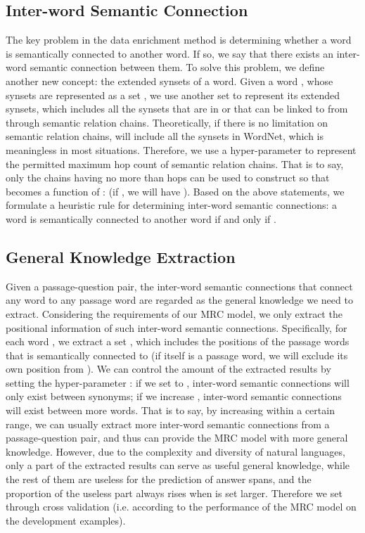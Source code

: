 \documentclass[11pt,a4paper]{article}
\begin{document}
\subsection{Inter-word Semantic Connection}
The key problem in the data enrichment method is determining whether a word is semantically connected to another word. If so, we say that there exists an inter-word semantic connection between them. To solve this problem, we define another new concept: the extended synsets of a word. Given a word , whose synsets are represented as a set , we use another set  to represent its extended synsets, which includes all the synsets that are in  or that can be linked to from  through semantic relation chains. Theoretically, if there is no limitation on semantic relation chains,  will include all the synsets in WordNet, which is meaningless in most situations. Therefore, we use a hyper-parameter  to represent the permitted maximum hop count of semantic relation chains. That is to say, only the chains having no more than  hops can be used to construct  so that  becomes a function of :  (if , we will have ). Based on the above statements, we formulate a heuristic rule for determining inter-word semantic connections: a word  is semantically connected to another word  if and only if .

\subsection{General Knowledge Extraction}
Given a passage-question pair, the inter-word semantic connections that connect any word to any passage word are regarded as the general knowledge we need to extract. Considering the requirements of our MRC model, we only extract the positional information of such inter-word semantic connections. Specifically, for each word , we extract a set , which includes the positions of the passage words that  is semantically connected to (if  itself is a passage word, we will exclude its own position from ). We can control the amount of the extracted results by setting the hyper-parameter : if we set  to , inter-word semantic connections will only exist between synonyms; if we increase , inter-word semantic connections will exist between more words. That is to say, by increasing  within a certain range, we can usually extract more inter-word semantic connections from a passage-question pair, and thus can provide the MRC model with more general knowledge. However, due to the complexity and diversity of natural languages, only a part of the extracted results can serve as useful general knowledge, while the rest of them are useless for the prediction of answer spans, and the proportion of the useless part always rises when  is set larger. Therefore we set  through cross validation (i.e. according to the performance of the MRC model on the development examples).
\end{document}
